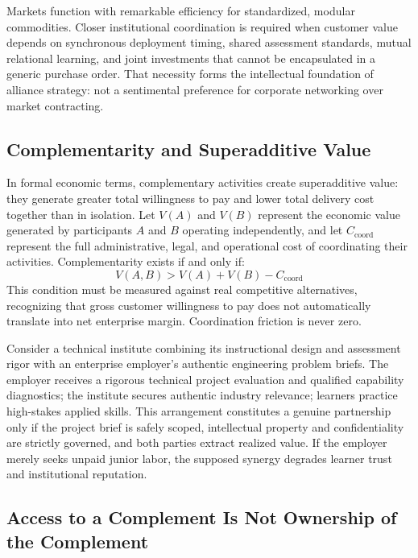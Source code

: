 Markets function with remarkable efficiency for standardized, modular commodities. Closer institutional coordination is required when customer value depends on synchronous deployment timing, shared assessment standards, mutual relational learning, and joint investments that cannot be encapsulated in a generic purchase order. That necessity forms the intellectual foundation of alliance strategy: not a sentimental preference for corporate networking over market contracting.

\subsection{Complementarity and Superadditive Value}
\label{sec:complementarity_and_superadditive_value}

In formal economic terms, complementary activities create superadditive value: they generate greater total willingness to pay and lower total delivery cost together than in isolation. Let $V(A)$ and $V(B)$ represent the economic value generated by participants $A$ and $B$ operating independently, and let $C_{\text{coord}}$ represent the full administrative, legal, and operational cost of coordinating their activities. Complementarity exists if and only if:
\begin{equation}
\label{eq:superadditive_complementarity}
V(A,B) > V(A) + V(B) - C_{\text{coord}}
\end{equation}
This condition must be measured against real competitive alternatives, recognizing that gross customer willingness to pay does not automatically translate into net enterprise margin. Coordination friction is never zero.

Consider a technical institute combining its instructional design and assessment rigor with an enterprise employer's authentic engineering problem briefs. The employer receives a rigorous technical project evaluation and qualified capability diagnostics; the institute secures authentic industry relevance; learners practice high-stakes applied skills. This arrangement constitutes a genuine partnership only if the project brief is safely scoped, intellectual property and confidentiality are strictly governed, and both parties extract realized value. If the employer merely seeks unpaid junior labor, the supposed synergy degrades learner trust and institutional reputation.

\subsection{Access to a Complement Is Not Ownership of the Complement}
\label{sec:access_versus_ownership}

